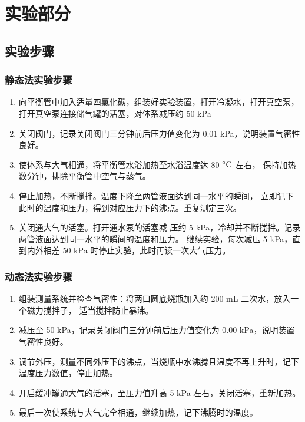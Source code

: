 \documentclass[cn,hazy,pku,12pt,normal,math=newtx,cite=super]{elegantnote}
\begin{document}
\section{实验部分}

\subsection{实验步骤}
\subsubsection{静态法实验步骤}

\begin{enumerate}
    \item 向平衡管中加入适量四氯化碳，组装好实验装置，打开冷凝水，打开真空泵，打开真空泵连接储气罐的活塞，对体系减压约 50 kPa
    \item 关闭阀门，记录关闭阀门三分钟前后压力值变化为 0.01 kPa，说明装置气密性良好。
    \item 使体系与大气相通，将平衡管水浴加热至水浴温度达 80 $\rm \degree C$ 左右，
    保持加热数分钟，排除平衡管中空气与蒸气。
    \item 停止加热，不断搅拌。温度下降至两管液面达到同一水平的瞬间，
    立即记下此时的温度和压力，得到对应压力下的沸点。重复测定三次。
    \item 关闭通大气的活塞。打开通水泵的活塞减
    压约 5 kPa，冷却并不断搅拌。记录两管液面达到同一水平的瞬间的温度和压力。
    继续实验，每次减压 5 kPa，直到内外相差 50 kPa 时停止实验，此时再读一次大气压力。
    
\end{enumerate}

\subsubsection{动态法实验步骤}

\begin{enumerate}
    \item 组装测量系统并检查气密性：将两口圆底烧瓶加入约 200 mL 二次水，放入一个磁力搅拌子，
    适当搅拌防止暴沸。
    \item 减压至 50 kPa，记录关闭阀门三分钟前后压力值变化为 0.00 kPa，说明装置气密性良好。
    \item 调节外压，测量不同外压下的沸点，当烧瓶中水沸腾且温度不再上升时，记下温度压力数值，停止加热。
    \item 开启缓冲罐通大气的活塞，至压力值升高 5 kPa 左右，关闭活塞，重新加热。
    \item 最后一次使系统与大气完全相通，继续加热，记下沸腾时的温度。
\end{enumerate}
\end{document}
